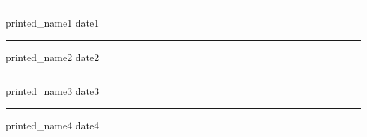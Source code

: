 \documentclass{article}
\begin{document}
\begin{Form}
\begin{multicols}{3}
\columnbreak

\parbox{0.8\columnwidth}{
\rule{3cm}{0.4pt}  \hspace{0.1cm} {{ printed_name1 }} \hspace{0.1cm} {{ date1 }}
\rule{3cm}{0.4pt}  \hspace{0.1cm} {{ printed_name2 }} \hspace{0.1cm} {{ date2 }}
\rule{3cm}{0.4pt}  \hspace{0.1cm} {{ printed_name3 }} \hspace{0.1cm} {{ date3 }}
\rule{3cm}{0.4pt}  \hspace{0.1cm} {{ printed_name4 }} \hspace{0.1cm} {{ date4 }}
}

\columnbreak
\parbox{0.8\columnwidth}{
}

\end{multicols}

\end{Form}
\end{document}
